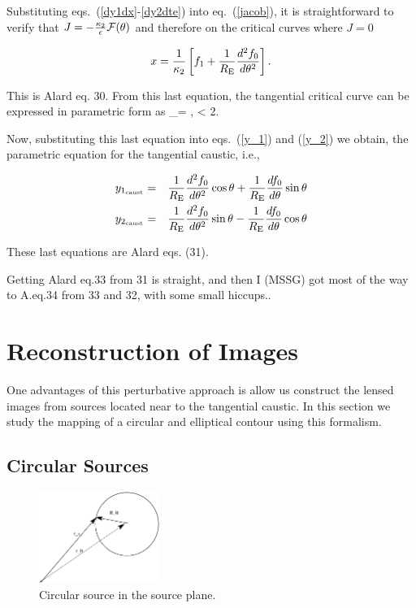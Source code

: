 Substituting eqs.~(\ref{dy1dx}-\ref{dy2dte}) into eq.~(\ref{jacob}), it is straightforward to verify that $J=-{\kappa_2 \over \epsilon} \mathcal{F}(\theta)$ and therefore on the critical curves where $J = 0$

\begin{equation}
x=\frac{1}{\kappa_2}\left[f_1+\frac{1}{R_{\mathrm{E}}}\frac{d^2f_0}{d\theta^2}\right] \label{xte}.
\end{equation}

This is Alard eq. 30. From this last equation, the tangential critical curve can be expressed
in parametric form as
\beq
{}_{}= , \leq \te < 2\pi.
\eeq

Now, substituting this last equation into eqs.~(\ref{y_1}) and (\ref{y_2}) we obtain, the parametric equation for
the tangential caustic, i.e.,

\begin{eqnarray}
y_{1_\mathrm{caust}} &=& \frac{1}{R_{\mathrm{E}}}\frac{d^2f_0}{d\theta^2}\cos{\theta}+\frac{1}{R_{\mathrm{E}}}\frac{df_0}{d\theta}\sin{\theta}\\
y_{2_\mathrm{caust}} &=& \frac{1}{R_{\mathrm{E}}}\frac{d^2f_0}{d\theta^2}\sin{\theta}-\frac{1}{R_{\mathrm{E}}}\frac{df_0}{d\theta}\cos{\theta}
\end{eqnarray}

These last equations are Alard eqs. (31).


Getting Alard eq.33 from 31 is straight, and then I (MSSG) got most of the way to
A.eq.34 from 33 and 32, with some small hiccups..

\section{Reconstruction of Images}

One advantages of this perturbative approach is allow us construct the lensed images
from sources located near to the tangential caustic.  In this section we
study the mapping of a circular and elliptical contour using this formalism.

\subsection{Circular Sources}

\begin{figure}
  \begin{center}
   \includegraphics[width=0.35\textwidth]{graphics/sourceplane.pdf}
  \end{center}
    \caption{\label{circular_source}Circular source in the source plane.}
\end{figure}

